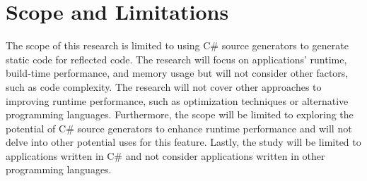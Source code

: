 \section{Scope and Limitations}

The scope of this research is limited to using C\# source generators to generate static code for reflected code. The research will focus on applications' runtime, build-time performance, and memory usage but will not consider other factors, such as code complexity. The research will not cover other approaches to improving runtime performance, such as optimization techniques or alternative programming languages. Furthermore, the scope will be limited to exploring the potential of C\# source generators to enhance runtime performance and will not delve into other potential uses for this feature. Lastly, the study will be limited to applications written in C\# and not consider applications written in other programming languages.
